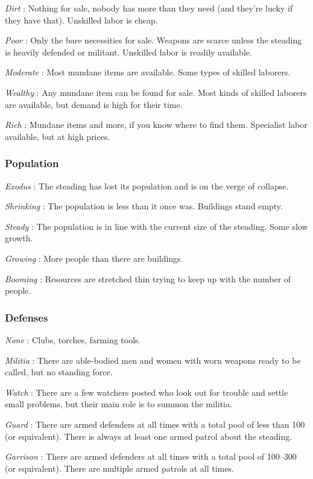  \emph{Dirt}
: Nothing for sale, nobody has more than they need (and they're lucky if they have that). Unskilled labor is cheap.


 \emph{Poor}
: Only the bare necessities for sale. Weapons are scarce unless the steading is heavily defended or militant. Unskilled labor is readily available.


 \emph{Moderate}
: Most mundane items are available. Some types of skilled laborers.


 \emph{Wealthy}
: Any mundane item can be found for sale. Most kinds of skilled laborers are available, but demand is high for their time.


 \emph{Rich}
: Mundane items and more, if you know where to find them. Specialist labor available, but at high prices.
\subsubsection{Population}


 \emph{Exodus}
: The steading has lost its population and is on the verge of collapse.


 \emph{Shrinking}
: The population is less than it once was. Buildings stand empty.


 \emph{Steady}
: The population is in line with the current size of the steading. Some slow growth.


 \emph{Growing}
: More people than there are buildings.


 \emph{Booming}
: Resources are stretched thin trying to keep up with the number of people.
\subsubsection{Defenses}


 \emph{None}
: Clubs, torches, farming tools.


 \emph{Militia}
: There are able-bodied men and women with worn weapons ready to be called, but no standing force.


 \emph{Watch}
: There are a few watchers posted who look out for trouble and settle small problems, but their main role is to summon the militia.


 \emph{Guard}
: There are armed defenders at all times with a total pool of less than 100 (or equivalent). There is always at least one armed patrol about the steading.


 \emph{Garrison}
: There are armed defenders at all times with a total pool of 100--300 (or equivalent). There are multiple armed patrols at all times.


